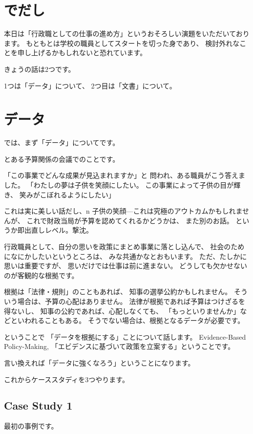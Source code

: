 \documentclass[uplatex,jis2004,dvipdfmx,12pt]{jsarticle}
\begin{document}
\section{でだし}
本日は「行政職としての仕事の進め方」というおそろしい演題をいただいております。
もともとは学校の職員としてスタートを切った身であり、
検討外れなことを申し上げるかもしれないと恐れています。

きょうの話は2つです。

1つは「データ」について、
2つ目は「文書」について。


\section{データ}
では、まず「データ」についてです。

とある予算関係の会議でのことです。

「この事業でどんな成果が見込まれますか」と
問われ、ある職員がこう答えました。
「わたしの夢は子供を笑顔にしたい。
この事業によって子供の目が輝き、
笑みがこぼれるようにしたい」

これは実に美しい話だし、n
子供の笑顔---これは究極のアウトカムかもしれませんが、
これで財政当局が予算を認めてくれるかどうかは、
また別のお話。
というか即出直しレベル。撃沈。

行政職員として、自分の思いを政策にまとめ事業に落とし込んで、
社会のためになにかしたいというところは、
みな共通かなとおもいます。
ただ、たしかに思いは重要ですが、
思いだけでは仕事は前に進まない。
どうしても欠かせないのが客観的な根拠です。

根拠は「法律・規則」のこともあれば、
知事の選挙公約かもしれません。
そういう場合は、予算の心配はありません。
法律が根拠であれば予算はつけざるを得ないし、
知事の公約であれば、心配しなくても、
「もっといりませんか」などといわれることもある。
そうでない場合は、根拠となるデータが必要です。

ということで
「データを根拠にする」ことについて話します。
Evidence-Based Policy-Making,
「エビデンスに基づいて政策を立案する」ということです。

言い換えれば「データに強くなろう」ということになります。

これからケーススタディを3つやります。

\subsection{Case Study 1}
最初の事例です。
\end{document}
